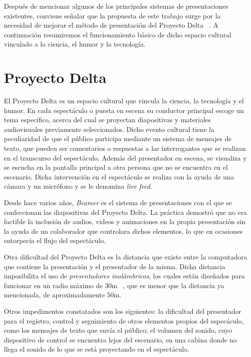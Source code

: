 
		Después de mencionar algunos de los principales sistemas de presentaciones existentes, conviene señalar que la propuesta de este trabajo surge por la necesidad de mejorar el método de presentación del Proyecto Delta ~\cite{delta}. A continuación resumiremos el funcionamiento básico de dicho espacio cultural vinculado a la ciencia, el humor y la tecnología.

	\section{Proyecto Delta} %
	\label{sec:proyecto_delta}

			El Proyecto Delta es un espacio cultural que vincula la ciencia, la tecnología y el humor. En cada espectáculo o puesta en escena su conductor principal escoge un tema específico, acerca del cual se proyectan diapositivas y materiales audiovisuales previamente seleccionados. Dicho evento cultural tiene la peculiaridad de que el público participa mediante un sistema de mensajes de texto, que pueden ser comentarios o respuestas a las interrogantes que se realizan en el transcurso del espectáculo. Además del presentador en escena, se visualiza y se escucha en la pantalla principal a otra persona que no se encuentra en el escenario. Dicha intervención en el espectáculo se realiza con la ayuda de una cámara y un micrófono y se le denomina \textit{live feed}.


			Desde hace varios años, \textit{Beamer} es el sistema de presentaciones con el que se confeccionan las diapositivas del Proyecto Delta. La práctica demostró que no era factible la inclusión de audios, videos y animaciones en la propia presentación sin la ayuda de un colaborador que controlara dichos elementos, lo que en ocasiones entorpecía el flujo del espectáculo. 



			Otra dificultad del Proyecto Delta es la distancia que existe entre la computadora que contiene la presentación y el presentador de la misma. Dicha distancia imposibilita el uso de \textit{presentadores inalámbricos}, los cuales están diseñados para funcionar en un radio máximo de 30m ~\cite{tikitiki}, que es menor que la distancia ya mencionada, de aproximadamente 50m.

			Otros impedimentos constatados son los siguientes: la dificultad del presentador para el registro, control y seguimiento de otros elementos propios del especáculo, como los mensajes de texto que envía el público; el volumen del sonido, cuyo dispositivo de control se encuentra lejos del escenario, en una cabina donde no llega el sonido de lo que se está proyectando en el espectáculo.


